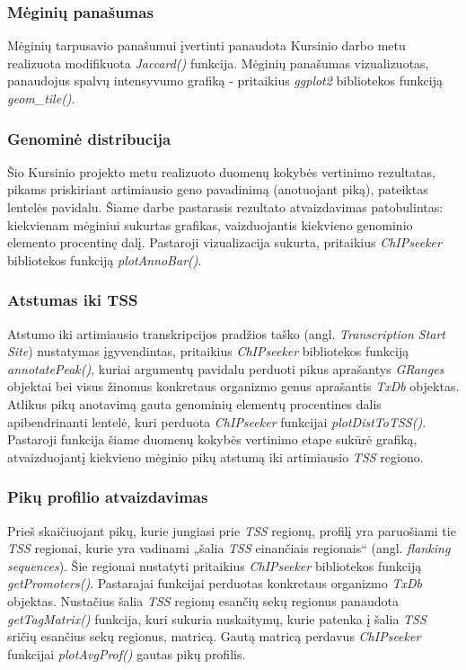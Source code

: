 \documentclass[12pt]{article}
\begin{document}
\subsubsection*{Mėginių panašumas}
Mėginių tarpusavio panašumui įvertinti panaudota Kursinio darbo metu
realizuota modifikuota \emph{Jaccard()} funkcija. Mėginių panašumas
vizualizuotas, panaudojus spalvų intensyvumo grafiką - pritaikius
\emph{ggplot2} bibliotekos funkciją \emph{geom\_tile()}.

\subsubsection*{Genominė distribucija}
Šio Kursinio projekto metu realizuoto duomenų kokybės vertinimo rezultatas,
pikams priskiriant artimiausio geno pavadinimą (anotuojant piką), pateiktas
lentelės pavidalu. Šiame darbe pastarasis rezultato atvaizdavimas patobulintas:
kiekvienam mėginiui sukurtas grafikas, vaizduojantis kiekvieno genominio
elemento procentinę dalį. Pastaroji vizualizacija sukurta, pritaikius
\emph{ChIPseeker}\cite{CHIPSEEKER} bibliotekos funkciją \emph{plotAnnoBar()}.

\subsubsection*{Atstumas iki TSS}
Atstumo iki artimiausio transkripcijos pradžios taško
(angl. \emph{Transcription Start Site}) nustatymas įgyvendintas, pritaikius
\emph{ChIPseeker} bibliotekos funkciją \emph{annotatePeak()}, kuriai argumentų
pavidalu perduoti pikus aprašantys \emph{GRanges}\cite{GRANGES} objektai bei
visus žinomus konkretaus organizmo genus aprašantis \emph{TxDb}\cite{TXDB_MM}
objektas. Atlikus pikų anotavimą gauta genominių elementų procentines dalis
apibendrinanti lentelė, kuri perduota \emph{ChIPseeker} funkcijai
\emph{plotDistToTSS()}. Pastaroji funkcija šiame duomenų kokybės vertinimo
etape sukūrė grafiką, atvaizduojantį kiekvieno mėginio pikų atstumą iki
artimiausio \emph{TSS} regiono.

\subsubsection*{Pikų profilio atvaizdavimas}
Prieš skaičiuojant pikų, kurie jungiasi prie \emph{TSS} regionų, profilį yra
paruošiami tie \emph{TSS} regionai, kurie yra vadinami „šalia \emph{TSS}
einančiais regionais“ (angl. \emph{flanking sequences}). Šie regionai nustatyti
pritaikius \emph{ChIPseeker} bibliotekos funkciją \emph{getPromoters()}.
Pastarajai funkcijai perduotas konkretaus organizmo \emph{TxDb} objektas.
Nustačius šalia \emph{TSS} regionų esančių sekų regionus panaudota
\emph{getTagMatrix()} funkcija, kuri sukuria nuskaitymų, kurie patenka į šalia
\emph{TSS} sričių esančius sekų regionus, matricą. Gautą matricą perdavus
\emph{ChIPseeker} funkcijai \emph{plotAvgProf()} gautas pikų profilis.
\end{document}

